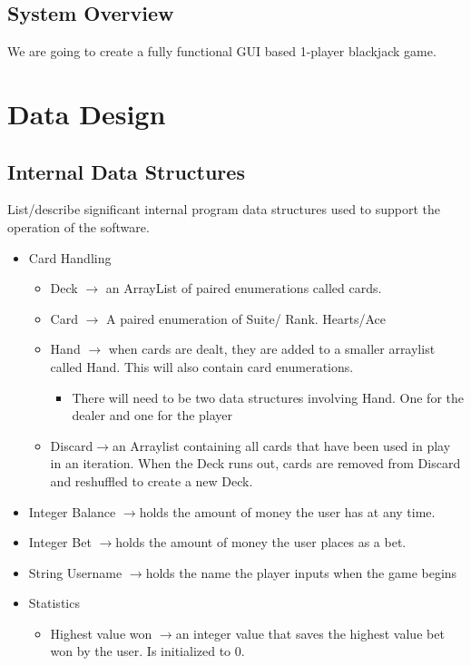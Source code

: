 \documentclass{article}
\begin{document}
\subsection{System Overview}
We are going to create a fully functional GUI based 1-player blackjack game.

\section{Data Design}

\subsection{Internal Data Structures}\label{DataDefs}
List/describe significant internal program data structures used to support the operation of the software.
\begin{itemize}
\item Card Handling 
\begin{itemize}
\item Deck $\rightarrow$ an ArrayList of paired enumerations called cards.  
\item Card $\rightarrow$ A paired enumeration of Suite/ Rank.  Hearts/Ace
\item Hand $\rightarrow$  when cards are dealt, they are added to a smaller arraylist called Hand.  This will also contain card enumerations.  
\begin{itemize}
\item There will need to be two data structures involving Hand.  One for the dealer and one for the player 
\end{itemize}
\item Discard$\rightarrow$an Arraylist containing all cards that have been used in play in an iteration.  When the Deck runs out, cards are removed from Discard and reshuffled to create a new Deck.  
\end{itemize}
\item Integer Balance $\rightarrow$holds the amount of money the user has at any time.
\item Integer Bet $\rightarrow$holds the amount of money the user places as a bet.
\item String Username $\rightarrow$holds the name the player inputs when the game begins
\item Statistics 
\begin{itemize}
\item Highest value won $\rightarrow$an integer value that saves the highest value bet won by the user.  Is initialized to 0.  

\end{itemize}
\end{itemize}
\end{document}
